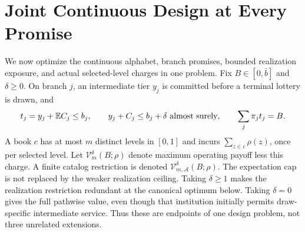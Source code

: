 \section{Joint Continuous Design at Every Promise}\label{sec:joint}
We now optimize the continuous alphabet, branch promises, bounded realization exposure, and actual selected-level charges in one problem. Fix $B\in[0,\bar b]$ and $\delta\geq0$. On branch $j$, an intermediate tier $y_j$ is committed before a terminal lottery is drawn, and
\begin{equation}\label{eq:unified-feasible}
 t_j=y_j+\mathbb E C_j\leq b_j,\qquad
 y_j+C_j\leq b_j+\delta\ \text{almost surely},\qquad
 \sum_j\pi_jt_j=B.
\end{equation}
A book $c$ has at most $m$ distinct levels in $[0,1]$ and incurs $\sum_{z\in c}\rho(z)$, once per selected level. Let $\mathcal V_m^\delta(B;\rho)$ denote maximum operating payoff less this charge. A finite catalog restriction is denoted $\mathcal V_{m,\mathcal A}^\delta(B;\rho)$. The expectation cap is not replaced by the weaker realization ceiling. Taking $\delta\geq1$ makes the realization restriction redundant at the canonical optimum below. Taking $\delta=0$ gives the full pathwise value, even though that institution initially permits draw-specific intermediate service. Thus these are endpoints of one design problem, not three unrelated extensions.

